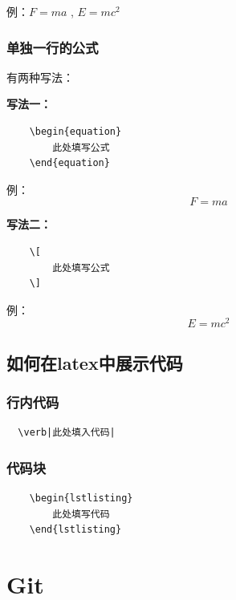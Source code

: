 \documentclass[UTF8]{ctexart}
\begin{document}
例：$F=ma$ , $E=mc^2$
\subsubsection{单独一行的公式}
有两种写法：

\textbf{写法一：}
\begin{lstlisting}
    \begin{equation}
        此处填写公式
    \end{equation}
\end{lstlisting}
\qquad 例：
\begin{equation}
    F=ma
\end{equation}

\textbf{写法二：}
\begin{lstlisting}
    \[
        此处填写公式
    \]
\end{lstlisting}
\qquad 例：
\[
    E=mc^2
\]

\subsection{如何在latex中展示代码} 
\subsubsection{行内代码} 
\begin{lstlisting}
  \verb|此处填入代码|
\end{lstlisting}

\subsubsection{代码块} 
\begin{Verbatim}
    \begin{lstlisting}
        此处填写代码
    \end{lstlisting}
\end{Verbatim}

\newpage
\section{Git}
\end{document}
